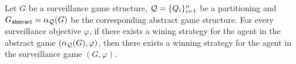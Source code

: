 \begin{theorem}
Let $G$ be a surveillance game structure, $\mathcal{Q} = \{Q_i\}_{i=1}^n$ be a partitioning and $G_{\mathsf{abstract}} = \alpha_{\mathcal{Q}}(G)$ be the corresponding abstract game structure. For every surveillance objective $\varphi$, if there exists a wining strategy for the agent in the abstract game $(\alpha_{\mathcal{Q}}(G),\varphi)$, then there exists a winning strategy for the agent in the surveillance game $(G,\varphi)$.
\end{theorem}
